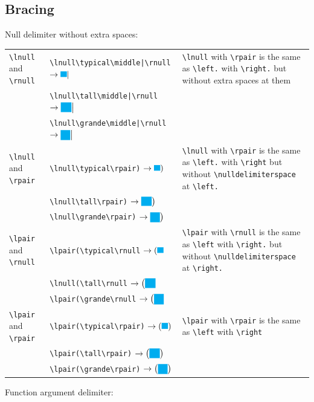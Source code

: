 \documentclass[a4paper,12pt]{article}
\begin{document}
\subsection{Bracing}
Null delimiter without extra spaces:
{\fontsize{8pt}{12pt}\selectfont
\begin{longtable}[c]{|L{0.3\textwidth}|L{0.3\textwidth}|L{0.3\textwidth}|}
\hline
\verb|\lnull| and \verb|\rnull| & \verb+\lnull\typical\middle|\rnull+
$\rightarrow\lnull\typical\middle|\rnull$ & \verb|\lnull| with \verb|\rpair| is the same as \verb|\left.| with \verb|\right.| but without extra spaces at them\\
& \verb+\lnull\tall\middle|\rnull+
$\rightarrow\lnull\tall\middle|\rnull$ & \\
& \verb+\lnull\grande\middle|\rnull+
$\rightarrow\lnull\grande\middle|\rnull$ & \\\hline
\verb|\lnull| and \verb|\rpair| & \verb|\lnull\typical\rpair)|
$\rightarrow\lnull\typical\rpair)$ & \verb|\lnull| with \verb|\rpair| is the same as \verb|\left.| with \verb|\right| but without \verb|\nulldelimiterspace| at \verb|\left.|\\
& \verb|\lnull\tall\rpair)|
$\rightarrow\lnull\tall\rpair)$ & \\
& \verb|\lnull\grande\rpair)|
$\rightarrow\lnull\grande\rpair)$  & \\\hline
\verb|\lpair| and \verb|\rnull| & \verb|\lpair(\typical\rnull|
$\rightarrow\lpair(\typical\rnull$ & \verb|\lpair| with \verb|\rnull| is the same as \verb|\left| with \verb|\right.| but without \verb|\nulldelimiterspace| at \verb|\right.|\\
& \verb|\lnull(\tall\rnull|
$\rightarrow\lpair(\tall\rnull$ & \\
& \verb|\lpair(\grande\rnull|
$\rightarrow\lpair(\grande\rnull$  & \\\hline
\verb|\lpair| and \verb|\rpair| & \verb|\lpair(\typical\rpair)|
$\rightarrow\lpair(\typical\rpair)$ & \verb|\lpair| with \verb|\rpair| is the same as \verb|\left| with \verb|\right|\\
& \verb|\lpair(\tall\rpair)|
$\rightarrow\lpair(\tall\rpair)$ & \\
& \verb|\lpair(\grande\rpair)|
$\rightarrow\lpair(\grande\rpair)$  & \\\hline
\end{longtable}
}
Function argument delimiter:
\end{document}
